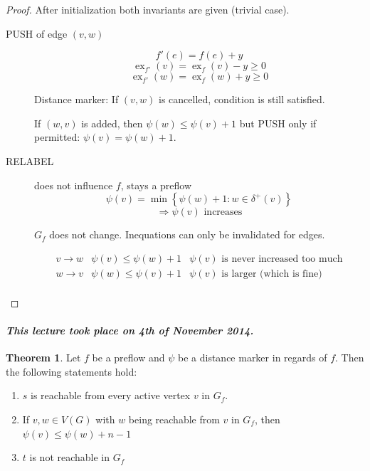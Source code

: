 \documentclass[a4paper]{article}
\theoremstyle{definition}
\newtheorem{theorem}{Theorem}
\newcommand{\set}[1]{\left\{#1\right\}}
\newcommand{\dateref}[1]{\paragraph{\textit{This lecture took place on #1.}}}
\begin{document}
\begin{proof}
  After initialization both invariants are given (trivial case).

  \begin{description}
    \item[PUSH of edge $(v, w)$]
      \[ f'(e) = f(e) + y \]
      \[ \operatorname{ex}_{f'}(v) = \operatorname{ex}_f(v) - y \geq 0 \]
      \[ \operatorname{ex}_{f'}(w) = \operatorname{ex}_f(w) + y \geq 0 \]

      Distance marker: If $(v, w)$ is cancelled, condition is still satisfied.

      If $(w, v)$ is added, then $\psi(w) \leq \psi(v) + 1$ but PUSH only if permitted:
      $\psi(v) = \psi(w) + 1$.

    \item[RELABEL] does not influence $f$, stays a preflow
      \[ \psi(v) = \min\set{\psi(w) + 1: w \in \delta^+(v)} \]
      \[ \Rightarrow \psi(v) \text{ increases} \]

      $G_f$ does not change. Inequations can only be invalidated for edges.

      \[
        \begin{array}{lll}
          v \rightarrow w & \psi(v) \leq \psi(w) + 1 & \text{$\psi(v)$ is never increased too much} \\
          w \rightarrow v & \psi(w) \leq \psi(v) + 1 & \text{$\psi(v)$ is larger (which is fine)} \\
        \end{array}
      \]
  \end{description}
\end{proof}

\dateref{4th of November 2014}

\begin{theorem}\label{lemma-4.9}
  Let $f$ be a preflow and $\psi$ be a distance marker in regards of $f$. Then the following statements hold:
  \begin{enumerate}
    \item $s$ is reachable from every active vertex $v$ in $G_f$.
    \item If $v, w \in V(G)$ with $w$ being reachable from $v$ in $G_f$,
          then $\psi(v) \leq \psi(w) + n - 1$
    \item $t$ is not reachable in $G_f$
  \end{enumerate}
\end{theorem}
\end{document}
